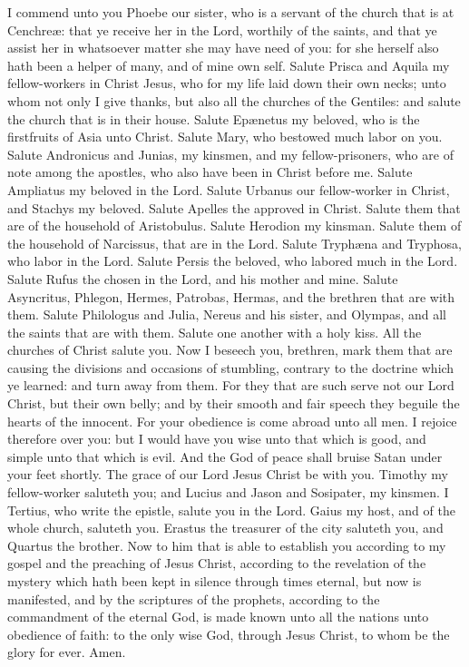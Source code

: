 I commend unto you Phoebe our sister, who is a servant of the church that is at Cenchreæ: that ye receive her in the Lord, worthily of the saints, and that ye assist her in whatsoever matter she may have need of you: for she herself also hath been a helper of many, and of mine own self.  Salute Prisca and Aquila my fellow-workers in Christ Jesus, who for my life laid down their own necks; unto whom not only I give thanks, but also all the churches of the Gentiles: and salute the church that is in their house. Salute Epænetus my beloved, who is the firstfruits of Asia unto Christ. Salute Mary, who bestowed much labor on you. Salute Andronicus and Junias, my kinsmen, and my fellow-prisoners, who are of note among the apostles, who also have been in Christ before me. Salute Ampliatus my beloved in the Lord. Salute Urbanus our fellow-worker in Christ, and Stachys my beloved. Salute Apelles the approved in Christ. Salute them that are of the household of Aristobulus. Salute Herodion my kinsman. Salute them of the household of Narcissus, that are in the Lord. Salute Tryphæna and Tryphosa, who labor in the Lord. Salute Persis the beloved, who labored much in the Lord. Salute Rufus the chosen in the Lord, and his mother and mine. Salute Asyncritus, Phlegon, Hermes, Patrobas, Hermas, and the brethren that are with them. Salute Philologus and Julia, Nereus and his sister, and Olympas, and all the saints that are with them. Salute one another with a holy kiss. All the churches of Christ salute you.  Now I beseech you, brethren, mark them that are causing the divisions and occasions of stumbling, contrary to the doctrine which ye learned: and turn away from them. For they that are such serve not our Lord Christ, but their own belly; and by their smooth and fair speech they beguile the hearts of the innocent. For your obedience is come abroad unto all men. I rejoice therefore over you: but I would have you wise unto that which is good, and simple unto that which is evil. And the God of peace shall bruise Satan under your feet shortly. The grace of our Lord Jesus Christ be with you.  Timothy my fellow-worker saluteth you; and Lucius and Jason and Sosipater, my kinsmen. I Tertius, who write the epistle, salute you in the Lord. Gaius my host, and of the whole church, saluteth you. Erastus the treasurer of the city saluteth you, and Quartus the brother.   Now to him that is able to establish you according to my gospel and the preaching of Jesus Christ, according to the revelation of the mystery which hath been kept in silence through times eternal, but now is manifested, and by the scriptures of the prophets, according to the commandment of the eternal God, is made known unto all the nations unto obedience of faith: to the only wise God, through Jesus Christ, to whom be the glory for ever. Amen. 